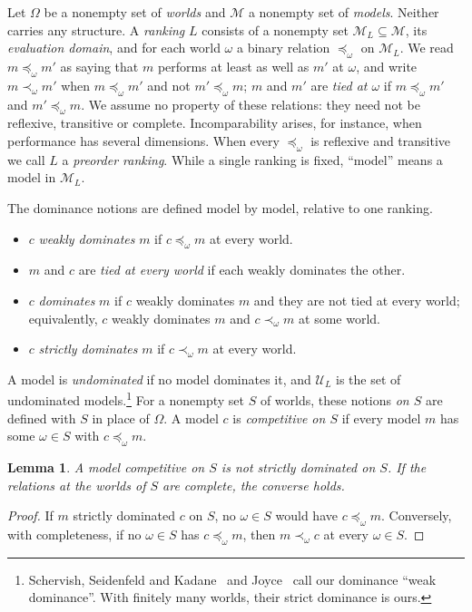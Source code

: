 \documentclass[11pt]{article}
\newtheorem{lemma}[theorem]{Lemma}
\theoremstyle{definition}
\theoremstyle{remark}
\newcommand{\M}{\mathcal M}
\newcommand{\U}{\mathcal U}
\begin{document}
Let $\Omega$ be a nonempty set of \emph{worlds} and $\M$ a nonempty set of \emph{models}. Neither carries any structure. A \emph{ranking} $L$ consists of a nonempty set $\M_L\subseteq\M$, its \emph{evaluation domain}, and for each world $\omega$ a binary relation $\preceq_\omega$ on $\M_L$. We read $m\preceq_\omega m'$ as saying that $m$ performs at least as well as $m'$ at $\omega$, and write $m\prec_\omega m'$ when $m\preceq_\omega m'$ and not $m'\preceq_\omega m$; $m$ and $m'$ are \emph{tied at $\omega$} if $m\preceq_\omega m'$ and $m'\preceq_\omega m$. We assume no property of these relations: they need not be reflexive, transitive or complete. Incomparability arises, for instance, when performance has several dimensions. When every $\preceq_\omega$ is reflexive and transitive we call $L$ a \emph{preorder ranking}. While a single ranking is fixed, ``model'' means a model in $\M_L$.

The dominance notions are defined model by model, relative to one ranking.
\begin{itemize}[leftmargin=*]
\item $c$ \emph{weakly dominates} $m$ if $c\preceq_\omega m$ at every world.
\item $m$ and $c$ are \emph{tied at every world} if each weakly dominates the other.
\item $c$ \emph{dominates} $m$ if $c$ weakly dominates $m$ and they are not tied at every world; equivalently, $c$ weakly dominates $m$ and $c\prec_\omega m$ at some world.
\item $c$ \emph{strictly dominates} $m$ if $c\prec_\omega m$ at every world.
\end{itemize}
A model is \emph{undominated} if no model dominates it, and $\U_L$ is the set of undominated models.\footnote{Schervish, Seidenfeld and Kadane~\cite{SSK09} and Joyce~\cite{Joyce} call our dominance ``weak dominance''. With finitely many worlds, their strict dominance is ours.} For a nonempty set $S$ of worlds, these notions \emph{on $S$} are defined with $S$ in place of $\Omega$. A model $c$ is \emph{competitive on $S$} if every model $m$ has some $\omega\in S$ with $c\preceq_\omega m$.

\begin{lemma}\label{lem:competitive}
A model competitive on $S$ is not strictly dominated on $S$. If the relations at the worlds of $S$ are complete, the converse holds.
\end{lemma}
\begin{proof}
If $m$ strictly dominated $c$ on $S$, no $\omega\in S$ would have $c\preceq_\omega m$. Conversely, with completeness, if no $\omega\in S$ has $c\preceq_\omega m$, then $m\prec_\omega c$ at every $\omega\in S$.
\end{proof}
\end{document}
